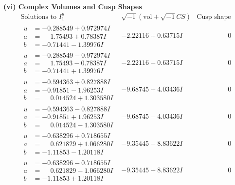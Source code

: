 \documentclass[1p]{elsarticle_modified}
\theoremstyle{definition}
\newcommand{\I}{\sqrt{-1}}
\begin{document}
\newpage\flushleft \textbf{(vi) Complex Volumes and Cusp Shapes}
$$\begin{array}{c|c|c}  
\text{Solutions to }I^u_{1}& \I (\text{vol} + \sqrt{-1}CS) & \text{Cusp shape}\\
 \hline 
\begin{aligned}
u &= -0.288549 + 0.972974 I \\
a &= \phantom{-}1.75493 + 0.78387 I \\
b &= -0.71441 - 1.39976 I\end{aligned}
 & -2.22116 + 0.63715 I & \phantom{-0.000000 } 0 \\ \hline\begin{aligned}
u &= -0.288549 - 0.972974 I \\
a &= \phantom{-}1.75493 - 0.78387 I \\
b &= -0.71441 + 1.39976 I\end{aligned}
 & -2.22116 - 0.63715 I & \phantom{-0.000000 } 0 \\ \hline\begin{aligned}
u &= -0.594363 + 0.827888 I \\
a &= -0.91851 - 1.96253 I \\
b &= \phantom{-}0.014524 + 1.303580 I\end{aligned}
 & -9.68745 + 4.03436 I & \phantom{-0.000000 } 0 \\ \hline\begin{aligned}
u &= -0.594363 - 0.827888 I \\
a &= -0.91851 + 1.96253 I \\
b &= \phantom{-}0.014524 - 1.303580 I\end{aligned}
 & -9.68745 - 4.03436 I & \phantom{-0.000000 } 0 \\ \hline\begin{aligned}
u &= -0.638296 + 0.718655 I \\
a &= \phantom{-}0.621829 + 1.066280 I \\
b &= -1.11853 - 1.20118 I\end{aligned}
 & -9.35445 - 8.83622 I & \phantom{-0.000000 } 0 \\ \hline\begin{aligned}
u &= -0.638296 - 0.718655 I \\
a &= \phantom{-}0.621829 - 1.066280 I \\
b &= -1.11853 + 1.20118 I\end{aligned}
 & -9.35445 + 8.83622 I & \phantom{-0.000000 } 0 \\ \hline\begin{aligned}

\end{aligned}
\end{array}$$
\end{document}

